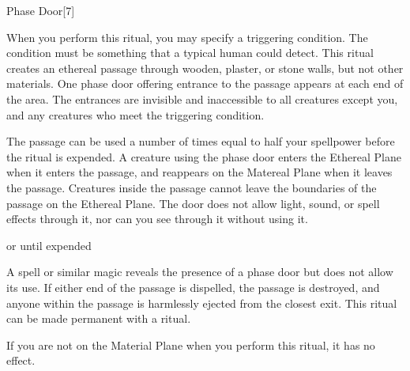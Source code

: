 \begin{spellsection}{Phase Door}[7]
    \begin{spellheader}
    \end{spellheader}
    \begin{spellcontent}
        \begin{spelltargetinginfo}
        \end{spelltargetinginfo}
        \begin{spelleffects}

            \spellspecial When you perform this ritual, you may specify a triggering condition. The condition must be something that a typical human could detect.
            \spellline
            \spelleffect This ritual creates an ethereal passage through wooden, plaster, or stone walls, but not other materials. One phase door offering entrance to the passage appears at each end of the area. The entrances are invisible and inaccessible to all creatures except you, and any creatures who meet the triggering condition.

            The passage can be used a number of times equal to half your spellpower before the ritual is expended. A creature using the phase door enters the Ethereal Plane when it enters the passage, and reappears on the Matereal Plane when it leaves the passage. Creatures inside the passage cannot leave the boundaries of the passage on the Ethereal Plane. The door does not allow light, sound, or spell effects through it, nor can you see through it without using it.

            \spelldur \durext or until expended
        \end{spelleffects}
    \end{spellcontent}
    \begin{spellfooter}
        \spellnotes A  spell or similar magic reveals the presence of a phase door but does not allow its use. If either end of the passage is dispelled, the passage is destroyed, and anyone within the passage is harmlessly ejected from the closest exit. This ritual can be made permanent with a  ritual.

        If you are not on the Material Plane when you perform this ritual, it has no effect.
    \end{spellfooter}
\end{spellsection}

